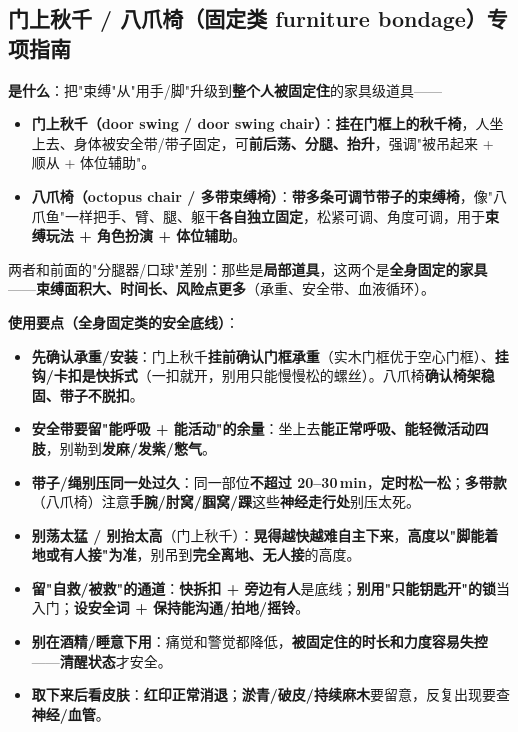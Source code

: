 \documentclass[12pt,UTF8,openany]{ctexbook}
\begin{document}
\subsection*{门上秋千 / 八爪椅（固定类 furniture bondage）专项指南}

\textbf{是什么}：把"束缚"从"用手/脚"升级到\textbf{整个人被固定住}的家具级道具——
\begin{itemize}[leftmargin=2em,itemsep=0.3em]
  \item \textbf{门上秋千（door swing / door swing chair）}：\textbf{挂在门框上的秋千椅}，人坐上去、身体被安全带/带子固定，可\textbf{前后荡、分腿、抬升}，强调"被吊起来 + 顺从 + 体位辅助"。
  \item \textbf{八爪椅（octopus chair / 多带束缚椅）}：\textbf{带多条可调节带子的束缚椅}，像"八爪鱼"一样把手、臂、腿、躯干\textbf{各自独立固定}，松紧可调、角度可调，用于\textbf{束缚玩法 + 角色扮演 + 体位辅助}。
\end{itemize}
两者和前面的"分腿器/口球"差别：那些是\textbf{局部道具}，这两个是\textbf{全身固定的家具}——\textbf{束缚面积大、时间长、风险点更多}（承重、安全带、血液循环）。

\begin{center}
\end{center}
\par\smallskip

\noindent\textbf{使用要点（全身固定类的安全底线）}：
\begin{itemize}[leftmargin=2em,itemsep=0.3em]
  \item \textbf{先确认承重/安装}：门上秋千\textbf{挂前确认门框承重}（实木门框优于空心门框）、\textbf{挂钩/卡扣是快拆式}（一扣就开，别用只能慢慢松的螺丝）。八爪椅\textbf{确认椅架稳固、带子不脱扣}。
  \item \textbf{安全带要留"能呼吸 + 能活动"的余量}：坐上去\textbf{能正常呼吸、能轻微活动四肢}，别勒到\textbf{发麻/发紫/憋气}。
  \item \textbf{带子/绳别压同一处过久}：同一部位\textbf{不超过 20--30\,min}，\textbf{定时松一松}；\textbf{多带款}（八爪椅）注意\textbf{手腕/肘窝/腘窝/踝}这些\textbf{神经走行处}别压太死。
  \item \textbf{别荡太猛 / 别抬太高}（门上秋千）：\textbf{晃得越快越难自主下来}，\textbf{高度以"脚能着地或有人接"为准}，别吊到\textbf{完全离地、无人接}的高度。
  \item \textbf{留"自救/被救"的通道}：\textbf{快拆扣 + 旁边有人}是底线；\textbf{别用"只能钥匙开"的锁}当入门；\textbf{设安全词 + 保持能沟通/拍地/摇铃}。
  \item \textbf{别在酒精/睡意下用}：痛觉和警觉都降低，\textbf{被固定住的时长和力度容易失控}——\textbf{清醒状态}才安全。
  \item \textbf{取下来后看皮肤}：\textbf{红印正常消退}；\textbf{淤青/破皮/持续麻木}要留意，反复出现要查\textbf{神经/血管}。
\end{itemize}
\end{document}
